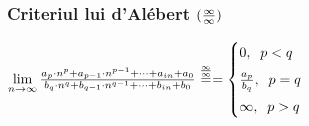 \documentclass[a4paper, 12pt, notitlepage]{book}
\begin{document}
    \subsubsection{Criteriul lui d'Al\'{e}bert $({\infty \over \infty})$}
    \begin{math}
      \lim\limits_{n\to\infty} \frac{a_{p} \cdot n^{p} + a_{p-1} \cdot n^{p-1} + \cdots + a_{i n} + a_{0}}{b_{q} \cdot n^{q} + b_{q-1} \cdot n^{q-1} + \cdots + b_{i n} + b_{0}} \stackrel{{\infty \over \infty}}{=}\\[5pt]
      =
      \begin{cases}
        0, \;\; p < q\\[5pt]
        \frac{a_{p}}{b_{q}}, \;\; p = q\\[5pt]
        \infty, \;\; p > q
      \end{cases}\\[5pt]
    \end{math}
\end{document}
